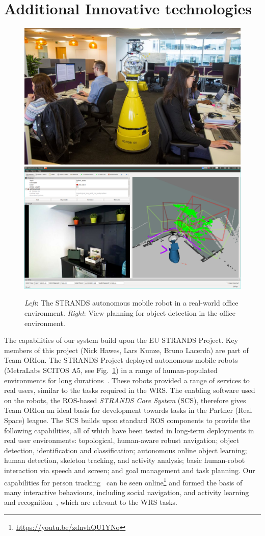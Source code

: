 \documentclass[runningheads,a4paper]{llncs}
\newcommand{\teamori}{Team ORIon}
\begin{document}
\section{Additional Innovative technologies}
\begin{figure}[tb]
  \begin{center}
    \includegraphics[width=.43\columnwidth]{images/betty.jpg}
    \includegraphics[width=.55\columnwidth,clip,trim=10ex 20ex 10ex 20ex]{images/viewplanning_at_tsc.png}
  \end{center} 
  \vspace{-10pt}  
  \caption{\textit{Left}: The STRANDS autonomous mobile robot in a real-world
  office environment. \textit{Right}: View planning for object detection in the
  office environment.}
  \label{fig:mk}
  \vspace{-3ex}
\end{figure}
The capabilities of our system build upon the EU STRANDS Project. Key members of this project (Nick Hawes, Lars Kunze, Bruno Lacerda) are part of \teamori. The STRANDS Project deployed autonomous mobile robots (MetraLabs SCITOS A5, see Fig.~\ref{fig:mk}) in a range of human-populated environments for long durations~\cite{strands@ram}. These robots provided a range of services to real users, similar to the tasks required in the WRS. The enabling software used on the robots, the ROS-based \emph{STRANDS Core System} (SCS), therefore gives \teamori{} an ideal basis for development towards tasks in the Partner (Real Space) league. The SCS builds upon standard ROS components to provide the following capabilities, all of which have been tested in long-term deployments in real user environments: topological, human-aware robust navigation; object detection, identification and classification; autonomous online object learning; human detection, skeleton tracking, and activity analysis; basic human-robot interaction via speech and screen; and goal management and task planning. Our capabilities for person tracking~\cite{dondrup2015tracker} can be seen online\footnote{\url{https://youtu.be/zdnvhQU1YNo}} and formed the basis of many interactive behaviours, including social navigation, and activity learning and recognition~\cite{duckworth_aamas2016}, which are relevant to the WRS tasks. 
\end{document}

